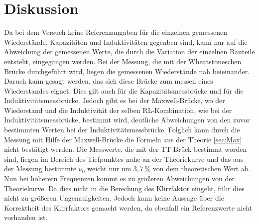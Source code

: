 \section{Diskussion}
\label{sec:Diskussion}
Da bei dem Versuch keine Referenzangaben für die
einzelnen gemessenen Wiederstände, Kapazitäten und Induktivitäten
gegenben sind, kann nur auf die Abweichung der gemessenen
Werte,
die durch die Variation der einzelnen Bauteile entsteht,
eingegangen werden.
Bei der Messung, die mit der Wheatstoneschen Brücke durchgeführt
wird, liegen die gemessenen Wiederstände nah beieinander.
Daruch kann gesagt werden, das sich diese Brücke zum
messen eines Wiederstandes eignet.
Dies gilt auch für die Kapazitätsmessbrücke und für
die Induktivitätsmessbrücke.
Jedoch gibt es bei der Maxwell-Brücke, wo der Wiederstand
und die Induktivität der selben
RL-Kombination, wie bei der Induktivitätsmessbrücke,
bestimmt wird, deutliche Abweichungen von den zuvor
bestimmten Werten bei der Induktivitätsmessbrücke.
Folglich kann durch die Messung mit Hilfe der Maxwell-Brücke
die Formeln aus der Theorie \ref{sec:Max} nicht bestätigt werden.
Die Messwerte, die mit der TT-Brück bestimmt worden sind,
liegen im Bereich des Tiefpunktes nahe an der Theoriekurve und
das aus der Messung bestimmte $\nu_0$ weicht nur
um $3,7\,\si{\percent}$ von dem theoretischen Wert ab.
Nun bei höherern Frequenzen kommt es zu größeren Abweichungen von der
Theoriekurve.
Da dies nicht in die Berechung des Klirrfaktor
eingeht, führ dies nicht zu größeren Ungenauigkeiten.
Jedoch kann keine Aussage über die Korrektheit
des Klirrfaktors gemacht werden, da ebenfall ein Referenzwerte nicht
vorhanden ist.
